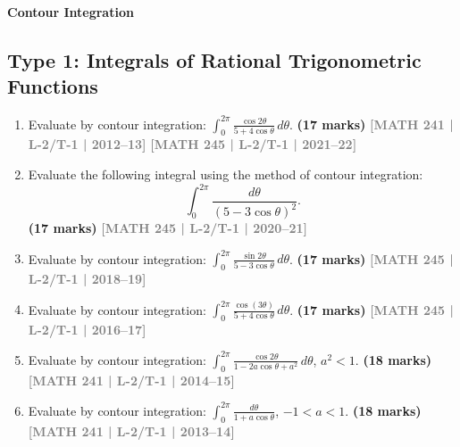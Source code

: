 \documentclass[12pt,a3paper]{article}
\newcommand{\yr}[1]{\hfill\textcolor{gray}{\small\textbf{[#1]}}}
\newcommand{\mk}[1]{\textcolor{orange!70!black}{\small\textbf{(#1 marks)}}}
\newcommand{\subtopic}[2]{%
  \vspace{10pt}
  \noindent\begin{tcolorbox}[colback=#1!8,colframe=#1,boxrule=0.6pt,arc=4pt,
    left=6pt,right=6pt,top=4pt,bottom=4pt]
    \small\bfseries\textcolor{#1}{#2}
  \end{tcolorbox}
  \vspace{2pt}
}
\begin{document}
\subtopic{cE}{Contour Integration}
\label{sub:s5-contour}

\subsection*{Type 1: Integrals of Rational Trigonometric Functions}

\begin{enumerate}

\item Evaluate by contour integration: $\displaystyle\int_{0}^{2\pi}\frac{\cos 2\theta}{5+4\cos\theta}\,d\theta$.
\mk{17} \yr{MATH 241 | L-2/T-1 | 2012--13} \yr{MATH 245 | L-2/T-1 | 2021--22}


\item Evaluate the following integral using the method of contour integration:
\[
\int_{0}^{2\pi} \frac{d\theta}{(5-3\cos\theta)^{2}}.
\]
\mk{17} \yr{MATH 245 | L-2/T-1 | 2020--21}


\item Evaluate by contour integration: $\displaystyle\int_{0}^{2\pi}\frac{\sin 2\theta}{5-3\cos\theta}\,d\theta$.
\mk{17} \yr{MATH 245 | L-2/T-1 | 2018--19}


\item Evaluate by contour integration: $\displaystyle\int_{0}^{2\pi}\frac{\cos(3\theta)}{5+4\cos\theta}\,d\theta$.
\mk{17} \yr{MATH 245 | L-2/T-1 | 2016--17}


\item Evaluate by contour integration: $\displaystyle\int_{0}^{2\pi}\frac{\cos 2\theta}{1-2a\cos\theta+a^{2}}\,d\theta$, \quad $a^{2}<1$.
\mk{18} \yr{MATH 241 | L-2/T-1 | 2014--15}


\item Evaluate by contour integration: $\displaystyle\int_{0}^{2\pi} \frac{d\theta}{1+a\cos\theta}$, \quad $-1<a<1$.
\mk{18} \yr{MATH 241 | L-2/T-1 | 2013--14}


\end{enumerate}


\end{document}
